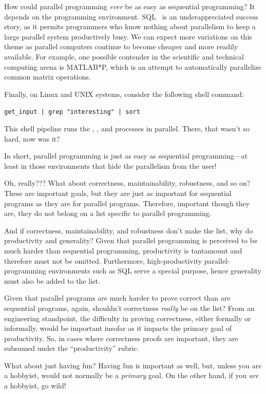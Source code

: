 \QuickQ{}
	How could parallel programming \emph{ever} be as easy
	as sequential programming?
\QuickA{}
	It depends on the programming environment.
	SQL~\cite{DIS9075SQL92} is an underappreciated success
	story, as it permits programmers who know nothing about parallelism
	to keep a large parallel system productively busy.
	We can expect more variations on this theme as parallel
	computers continue to become cheaper and more readily available.
	For example, one possible contender in the scientific and
	technical computing arena is MATLAB*P,
	which is an attempt to automatically parallelize common
	matrix operations.

	Finally, on Linux and UNIX systems, consider the following
	shell command:

	{\small \tt get\_input | grep "interesting" | sort}

	This shell pipeline runs the , ,
	and  processes in parallel.
	There, that wasn't so hard, now was it?

	In short, parallel programming is just as easy as sequential
	programming---at least in those environments that hide the parallelism
	from the user!

\QuickQ{}
	Oh, really???
	What about correctness, maintainability, robustness, and so on?
\QuickA{}
	These are important goals, but they are just as important for
	sequential programs as they are for parallel programs.
	Therefore, important though they are, they do not belong on
	a list specific to parallel programming.

\QuickQ{}
	And if correctness, maintainability, and robustness don't
	make the list, why do productivity and generality?
\QuickA{}
	Given that parallel programming is perceived to be much harder
	than sequential programming, productivity is tantamount and
	therefore must not be omitted.
	Furthermore, high-productivity parallel-programming environments
	such as SQL serve a special purpose, hence generality must
	also be added to the list.

\QuickQ{}
	Given that parallel programs are much harder to prove
	correct than are sequential programs, again, shouldn't
	correctness \emph{really} be on the list?
\QuickA{}
	From an engineering standpoint, the difficulty in proving
	correctness, either formally or informally, would be important
	insofar as it impacts the primary goal of productivity.
	So, in cases where correctness proofs are important, they
	are subsumed under the ``productivity'' rubric.

\QuickQ{}
	What about just having fun?
\QuickA{}
	Having fun is important as well, but, unless you are a hobbyist,
	would not normally be a \emph{primary} goal.
	On the other hand, if you \emph{are} a hobbyist, go wild!

